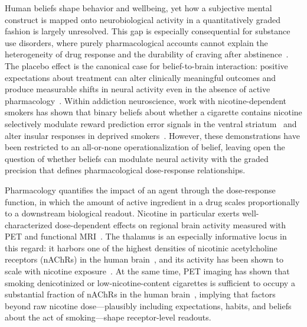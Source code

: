 \documentclass[11pt]{article}
\begin{document}
Human beliefs shape behavior and wellbeing, yet how a subjective mental construct is mapped onto neurobiological activity in a quantitatively graded fashion is largely unresolved. This gap is especially consequential for substance use disorders, where purely pharmacological accounts cannot explain the heterogeneity of drug response and the durability of craving after abstinence~\cite{picciotto2008nicotinic,benowitz2009pharmacology}. The placebo effect is the canonical case for belief-to-brain interaction: positive expectations about treatment can alter clinically meaningful outcomes and produce measurable shifts in neural activity even in the absence of active pharmacology~\cite{wager2004placebo,benedetti2013placebo}. Within addiction neuroscience, work with nicotine-dependent smokers has shown that binary beliefs about whether a cigarette contains nicotine selectively modulate reward prediction error signals in the ventral striatum~\cite{gu2015belief} and alter insular responses in deprived smokers~\cite{gu2016belief}. However, these demonstrations have been restricted to an all-or-none operationalization of belief, leaving open the question of whether beliefs can modulate neural activity with the graded precision that defines pharmacological dose-response relationships.

Pharmacology quantifies the impact of an agent through the dose-response function, in which the amount of active ingredient in a drug scales proportionally to a downstream biological readout. Nicotine in particular exerts well-characterized dose-dependent effects on regional brain activity measured with PET and functional MRI~\cite{brody2006cigarette,cosgrove2009beta2}. The thalamus is an especially informative locus in this regard: it harbors one of the highest densities of nicotinic acetylcholine receptors (nAChRs) in the human brain~\cite{picciotto2008nicotinic,cosgrove2009beta2}, and its activity has been shown to scale with nicotine exposure~\cite{brody2006cigarette}. At the same time, PET imaging has shown that smoking denicotinized or low-nicotine-content cigarettes is sufficient to occupy a substantial fraction of nAChRs in the human brain~\cite{brody2011ventral,cosgrove2009beta2}, implying that factors beyond raw nicotine dose---plausibly including expectations, habits, and beliefs about the act of smoking---shape receptor-level readouts.
\end{document}
